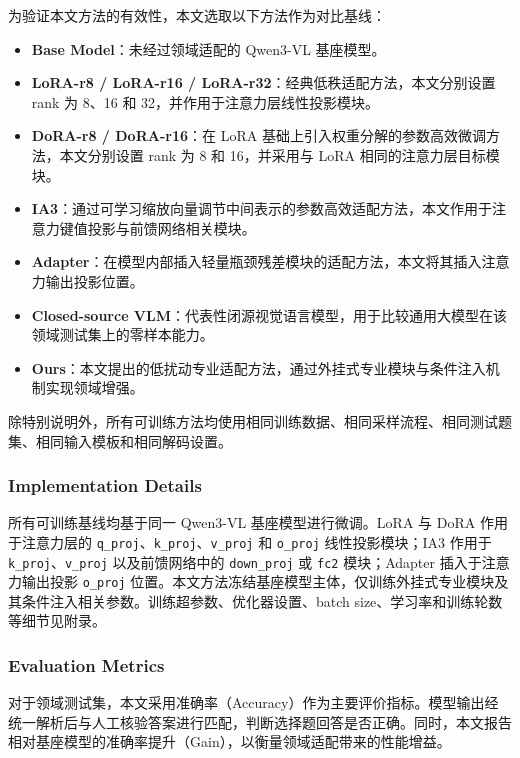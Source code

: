 \documentclass[journal]{IEEEtran}
\begin{document}
为验证本文方法的有效性，本文选取以下方法作为对比基线：
\begin{itemize}
    \item \textbf{Base Model}：未经过领域适配的 Qwen3-VL 基座模型。
    \item \textbf{LoRA-r8 / LoRA-r16 / LoRA-r32}：经典低秩适配方法，本文分别设置 rank 为 8、16 和 32，并作用于注意力层线性投影模块。
    \item \textbf{DoRA-r8 / DoRA-r16}：在 LoRA 基础上引入权重分解的参数高效微调方法，本文分别设置 rank 为 8 和 16，并采用与 LoRA 相同的注意力层目标模块。
    \item \textbf{IA3}：通过可学习缩放向量调节中间表示的参数高效适配方法，本文作用于注意力键值投影与前馈网络相关模块。
    \item \textbf{Adapter}：在模型内部插入轻量瓶颈残差模块的适配方法，本文将其插入注意力输出投影位置。
    \item \textbf{Closed-source VLM}：代表性闭源视觉语言模型，用于比较通用大模型在该领域测试集上的零样本能力。
    \item \textbf{Ours}：本文提出的低扰动专业适配方法，通过外挂式专业模块与条件注入机制实现领域增强。
\end{itemize}

除特别说明外，所有可训练方法均使用相同训练数据、相同采样流程、相同测试题集、相同输入模板和相同解码设置。

\subsubsection{Implementation Details}

所有可训练基线均基于同一 Qwen3-VL 基座模型进行微调。LoRA 与 DoRA 作用于注意力层的 \texttt{q\_proj}、\texttt{k\_proj}、\texttt{v\_proj} 和 \texttt{o\_proj} 线性投影模块；IA3 作用于 \texttt{k\_proj}、\texttt{v\_proj} 以及前馈网络中的 \texttt{down\_proj} 或 \texttt{fc2} 模块；Adapter 插入于注意力输出投影 \texttt{o\_proj} 位置。本文方法冻结基座模型主体，仅训练外挂式专业模块及其条件注入相关参数。训练超参数、优化器设置、batch size、学习率和训练轮数等细节见附录。

\subsubsection{Evaluation Metrics}

对于领域测试集，本文采用准确率（Accuracy）作为主要评价指标。模型输出经统一解析后与人工核验答案进行匹配，判断选择题回答是否正确。同时，本文报告相对基座模型的准确率提升（Gain），以衡量领域适配带来的性能增益。
\end{document}
